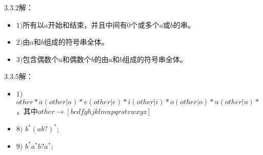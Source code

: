 \documentclass[UTF8,noindent]{ctexart}
\begin{document}
$3.3.2$解：
\begin{itemize}
  \item $1)$所有以$a$开始和结束，并且中间有$0$个或多个$a$或$b$的串。
\item $2)$由$a$和$b$组成的符号串全体。
\item $3)$包含偶数个$a$和偶数个$b$的由$a$和$b$组成的符号串全体。
\end{itemize}

$3.3.5$解：
\begin{itemize}
  \item $1)$ $other* a (other|a)* e (other|e)* i (other|i)* o (other|o)* u (other|u)*$，其中$other \rightarrow [bcdfghjklmnpqrstvwxyz]$
\item $8)$ $b^*(ab?)^*$;
\item $9)$ $b^*a^*b?a^*$;
\end{itemize}
\end{document}
